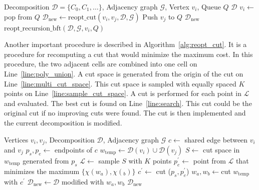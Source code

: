 \documentclass[../main.tex]{subfiles}
\begin{document}
\begin{algorithm}
	\caption{$\text{reopt\_recursion\_bft}(\mathcal{D}, \mathcal{G}, v_i, Q)$}
	\label{alg:reopt_recursion_bft}
	\begin{algorithmic}[1]
		\REQUIRE Decomposition $\mathcal{D}=\{C_0,C_1,\ldots\}$, Adjacency graph $\mathcal{G}$, Vertex $v_i$, Queue $Q$
				\RETURN $\mathcal{D}$
			\ENDIF
			\STATE $v_i\gets$ pop from $Q$
					\STATE $\mathcal{D}_{\text{new}}\gets\text{reopt\_cut}(v_i,v_j,\mathcal{D},\mathcal{G})$ \label{line:multi_reopt_cut}
						\STATE Push $v_j$ to $Q$
					\ELSE
						\RETURN $\mathcal{D}_{\text{new}}$
					\ENDIF
				\ENDIF
			\ENDFOR
			\RETURN $\text{reopt\_recursion\_bft}(\mathcal{D}, \mathcal{G}, v_i, Q)$
	\end{algorithmic}
\end{algorithm}


Another important procedure is described in Algorithm~\ref{alg:reopt_cut}. It is a procedure for recomputing a cut that would minimize the maximum cost. In this procedure, the two adjacent cells are combined into one cell on Line~\ref{line:poly_union}. A cut space is generated from the origin of the cut on Line~\ref{line:multi_cut_space}. This cut space is sampled with equally spaced $K$ points on Line~\ref{line:sample_cut_space}. A cut is performed for each point in $\mathcal{L}$ and evaluated. The best cut is found on Line~\ref{line:search}. This cut could be the original cut if no improving cuts were found. The cut is then implemented and the current decomposition is modified.

\begin{algorithm}
	\caption{$\text{reopt\_cut}(v_i, v_j, \mathcal{D},\mathcal{G})$}
	\label{alg:reopt_cut}
	\begin{algorithmic}[1]
		\REQUIRE Vertices $v_i, v_j$, Decomposition $\mathcal{D}$, Adjacency graph $\mathcal{G}$
			\STATE $c\gets$ shared edge between $v_i$ and $v_j$ \label{line:shared_edge}
			\STATE $p_s,p_e\gets$ endpoints of $c$
			\STATE $w_{\text{temp}}\gets \mathcal{D}(v_i)\cup\mathcal{D}(v_j)$ \label{line:poly_union}
			\STATE $S\gets$ cut space in $w_{\text{temp}}$ generated from $p_s$ \label{line:multi_cut_space}
			\STATE $\mathcal{L}\gets$ sample $S$ with $K$ points \label{line:sample_cut_space}
			\STATE $p_e^{'}\gets$ point from $\mathcal{L}$ that minimizes the maximum $\{\chi(w_a),\chi(_b)\}$ \label{line:search}
			\STATE $c^{'}\gets$ cut ($p_s,p_e^{'}$)
			\STATE $w_a,w_b\gets$cut $w_{\text{temp}}$ with $c^{'}$ \label{line:perform_cut}
			\STATE $\mathcal{D}_{\text{new}}\gets\mathcal{D}$ modified with $w_a,w_b$
			\RETURN $\mathcal{D}_{\text{new}}$
	\end{algorithmic}
\end{algorithm}
\end{document}

